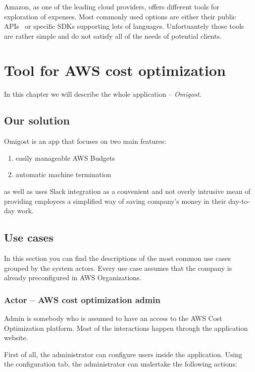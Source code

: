 \documentclass[licencjacka,en]{thesisclass}
\begin{document}
    Amazon, as one of the leading cloud providers,
    offers different tools for exploration of expenses.
    Most commonly used options are either their public APIs~\cite{AWSCostManagement}
    or specific SDKs supporting lots of languages.
    Unfortuantely those tools are rather simple and do not satisfy
    all of the needs of potential clients.

    \chapter{Tool for AWS cost optimization}

    In this chapter we will describe the whole application -- \textit{Omigost}.

    \section{Our solution}

    Omigost is an app that focuses on two main features:
    \begin{enumerate}
        \item easily manageable AWS Budgets
        \item automatic machine termination
    \end{enumerate}

    as well as uses Slack integration as a convenient and not overly intrusive mean
    of providing employees a simplified way of saving company's money in their day-to-day work.

    \section{Use cases}

    In this section you can find the descriptions of the most common use cases
    grouped by the system actors.
    Every use case assumes that the company is already
    preconfigured in AWS Organizations.

    \subsection{Actor -- AWS cost optimization admin}

    Admin is somebody who is assumed to have an access to the AWS Cost Optimization platform.
    Most of the interactions happen through the application website.

    First of all, the administrator can configure users inside the application.
    Using the configuration tab, the administrator can undertake the following actions:
\end{document}
